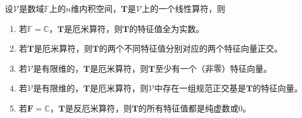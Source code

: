 \documentclass[main.tex]{subfiles}
\begin{document}
\begin{theorem}\label{thm:II.2.32}
    设$\mathcal{V}$是数域$\mathbb{F}$上的$n$维内积空间，$\mathbf{T}$是$\mathcal{V}$上的一个线性算符，则
    \begin{enumerate}
        \item 若$\mathbb{F}=\mathbb{C}$，$\mathbf{T}$是厄米算符，则$\mathbf{T}$的特征值全为实数。
        \item 若$\mathbf{T}$是厄米算符，则$\mathbf{T}$的两个不同特征值分别对应的两个特征向量正交。
        \item 若$\mathcal{V}$是有限维的，$\mathbf{T}$是厄米算符，则$\mathbf{T}$至少有一个（非零）特征向量。
        \item 若$\mathcal{V}$是有限维的，$\mathbf{T}$是厄米算符，则$\mathcal{V}$中存在一组规范正交基是$\mathbf{T}$的特征向量。
        \item 若$\mathbf{F}=\mathbb{C}$，$\mathbf{T}$是反厄米算符，则$\mathbf{T}$的所有特征值都是纯虚数或0。
    \end{enumerate}
\end{theorem}
\end{document}
